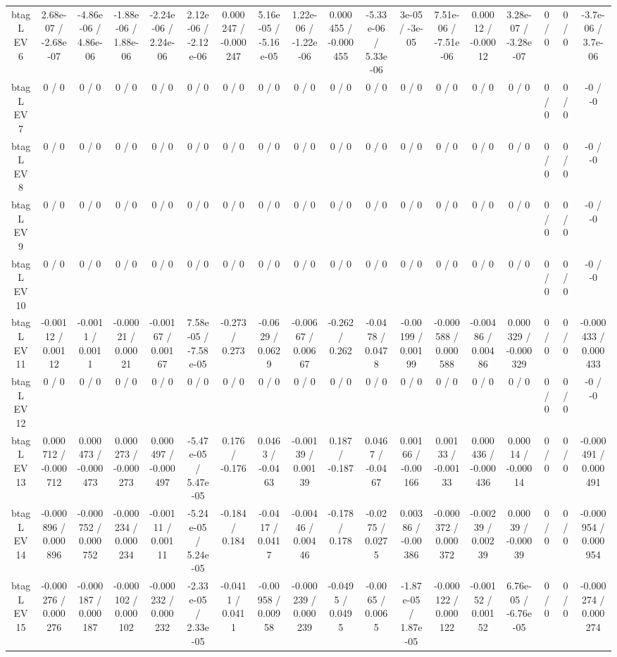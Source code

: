 \documentclass[10pt]{article}
\begin{document}
\begin{table}[htbp]
\begin{center}
\begin{tabular}{|c|c|c|c|c|c|c|c|c|c|c|c|c|c|c|c|c|c|}
  btag L EV 6 & 2.68e-07 / -2.68e-07 & -4.86e-06 / 4.86e-06 & -1.88e-06 / 1.88e-06 & -2.24e-06 / 2.24e-06 & 2.12e-06 / -2.12e-06 & 0.000247 / -0.000247 & 5.16e-05 / -5.16e-05 & 1.22e-06 / -1.22e-06 & 0.000455 / -0.000455 & -5.33e-06 / 5.33e-06 & 3e-05 / -3e-05 & 7.51e-06 / -7.51e-06 & 0.00012 / -0.00012 & 3.28e-07 / -3.28e-07 & 0 / 0 & 0 / 0 & -3.7e-06 / 3.7e-06 \\ 
  btag L EV 7 & 0 / 0 & 0 / 0 & 0 / 0 & 0 / 0 & 0 / 0 & 0 / 0 & 0 / 0 & 0 / 0 & 0 / 0 & 0 / 0 & 0 / 0 & 0 / 0 & 0 / 0 & 0 / 0 & 0 / 0 & 0 / 0 & -0 / -0 \\ 
  btag L EV 8 & 0 / 0 & 0 / 0 & 0 / 0 & 0 / 0 & 0 / 0 & 0 / 0 & 0 / 0 & 0 / 0 & 0 / 0 & 0 / 0 & 0 / 0 & 0 / 0 & 0 / 0 & 0 / 0 & 0 / 0 & 0 / 0 & -0 / -0 \\ 
  btag L EV 9 & 0 / 0 & 0 / 0 & 0 / 0 & 0 / 0 & 0 / 0 & 0 / 0 & 0 / 0 & 0 / 0 & 0 / 0 & 0 / 0 & 0 / 0 & 0 / 0 & 0 / 0 & 0 / 0 & 0 / 0 & 0 / 0 & -0 / -0 \\ 
  btag L EV 10 & 0 / 0 & 0 / 0 & 0 / 0 & 0 / 0 & 0 / 0 & 0 / 0 & 0 / 0 & 0 / 0 & 0 / 0 & 0 / 0 & 0 / 0 & 0 / 0 & 0 / 0 & 0 / 0 & 0 / 0 & 0 / 0 & -0 / -0 \\ 
  btag L EV 11 & -0.00112 / 0.00112 & -0.0011 / 0.0011 & -0.00021 / 0.00021 & -0.00167 / 0.00167 & 7.58e-05 / -7.58e-05 & -0.273 / 0.273 & -0.0629 / 0.0629 & -0.00667 / 0.00667 & -0.262 / 0.262 & -0.0478 / 0.0478 & -0.00199 / 0.00199 & -0.000588 / 0.000588 & -0.00486 / 0.00486 & 0.000329 / -0.000329 & 0 / 0 & 0 / 0 & -0.000433 / 0.000433 \\ 
  btag L EV 12 & 0 / 0 & 0 / 0 & 0 / 0 & 0 / 0 & 0 / 0 & 0 / 0 & 0 / 0 & 0 / 0 & 0 / 0 & 0 / 0 & 0 / 0 & 0 / 0 & 0 / 0 & 0 / 0 & 0 / 0 & 0 / 0 & -0 / -0 \\ 
  btag L EV 13 & 0.000712 / -0.000712 & 0.000473 / -0.000473 & 0.000273 / -0.000273 & 0.000497 / -0.000497 & -5.47e-05 / 5.47e-05 & 0.176 / -0.176 & 0.0463 / -0.0463 & -0.00139 / 0.00139 & 0.187 / -0.187 & 0.0467 / -0.0467 & 0.00166 / -0.00166 & 0.00133 / -0.00133 & 0.000436 / -0.000436 & 0.00014 / -0.00014 & 0 / 0 & 0 / 0 & -0.000491 / 0.000491 \\ 
  btag L EV 14 & -0.000896 / 0.000896 & -0.000752 / 0.000752 & -0.000234 / 0.000234 & -0.00111 / 0.00111 & -5.24e-05 / 5.24e-05 & -0.184 / 0.184 & -0.0417 / 0.0417 & -0.00446 / 0.00446 & -0.178 / 0.178 & -0.0275 / 0.0275 & 0.00386 / -0.00386 & -0.000372 / 0.000372 & -0.00239 / 0.00239 & 0.00039 / -0.00039 & 0 / 0 & 0 / 0 & -0.000954 / 0.000954 \\ 
  btag L EV 15 & -0.000276 / 0.000276 & -0.000187 / 0.000187 & -0.000102 / 0.000102 & -0.000232 / 0.000232 & -2.33e-05 / 2.33e-05 & -0.0411 / 0.0411 & -0.00958 / 0.00958 & -0.000239 / 0.000239 & -0.0495 / 0.0495 & -0.0065 / 0.0065 & -1.87e-05 / 1.87e-05 & -0.000122 / 0.000122 & -0.00152 / 0.00152 & 6.76e-05 / -6.76e-05 & 0 / 0 & 0 / 0 & -0.000274 / 0.000274 \\ 

\end{tabular}
\end{center}
\end{table}
\end{document}
